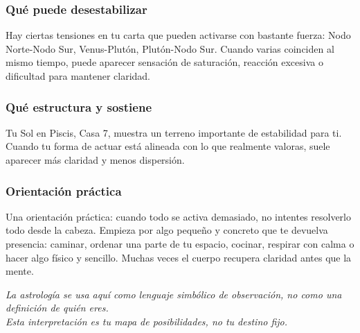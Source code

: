 \documentclass[11pt,a4paper]{article}
\begin{document}
\subsubsection*{Qué puede desestabilizar}
Hay ciertas tensiones en tu carta que pueden activarse con bastante fuerza: Nodo Norte-Nodo Sur, Venus-Plutón, Plutón-Nodo Sur. Cuando varias coinciden al mismo tiempo, puede aparecer sensación de saturación, reacción excesiva o dificultad para mantener claridad.

\subsubsection*{Qué estructura y sostiene}
Tu Sol en Piscis, Casa 7, muestra un terreno importante de estabilidad para ti. Cuando tu forma de actuar está alineada con lo que realmente valoras, suele aparecer más claridad y menos dispersión.

\subsubsection*{Orientación práctica}
Una orientación práctica: cuando todo se activa demasiado, no intentes resolverlo todo desde la cabeza. Empieza por algo pequeño y concreto que te devuelva presencia: caminar, ordenar una parte de tu espacio, cocinar, respirar con calma o hacer algo físico y sencillo. Muchas veces el cuerpo recupera claridad antes que la mente.

\vspace{1cm}
\begin{center}
{\small\itshape\color{grisai}
La astrología se usa aquí como lenguaje simbólico de observación, no como una definición de quién eres.\\
Esta interpretación es tu mapa de posibilidades, no tu destino fijo.
}
\end{center}
\end{document}
